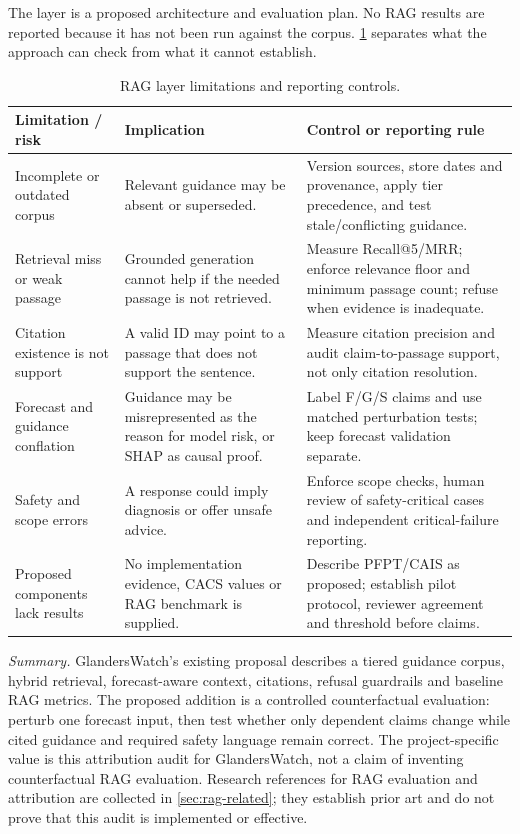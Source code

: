 \documentclass[10pt,openany]{report}
\begin{document}
The layer is a proposed architecture and evaluation plan. No RAG results are reported because it has
not been run against the corpus. \cref{tab:rag-limits} separates what the approach can check from
what it cannot establish.

\begin{table}[htbp]
\centering
\caption{RAG layer limitations and reporting controls.}
\label{tab:rag-limits}
\small
\begin{tabular}{@{}>{\raggedright\arraybackslash}p{3.4cm}
                >{\raggedright\arraybackslash}p{5.0cm}
                >{\raggedright\arraybackslash}p{5.4cm}@{}}
\toprule
\textbf{Limitation / risk} & \textbf{Implication} & \textbf{Control or reporting rule} \\
\midrule
Incomplete or outdated corpus &
Relevant guidance may be absent or superseded. &
Version sources, store dates and provenance, apply tier precedence, and test stale/conflicting guidance. \\
Retrieval miss or weak passage &
Grounded generation cannot help if the needed passage is not retrieved. &
Measure Recall@5/MRR; enforce relevance floor and minimum passage count; refuse when evidence is inadequate. \\
Citation existence is not support &
A valid ID may point to a passage that does not support the sentence. &
Measure citation precision and audit claim-to-passage support, not only citation resolution. \\
Forecast and guidance conflation &
Guidance may be misrepresented as the reason for model risk, or SHAP as causal proof. &
Label F/G/S claims and use matched perturbation tests; keep forecast validation separate. \\
Safety and scope errors &
A response could imply diagnosis or offer unsafe advice. &
Enforce scope checks, human review of safety-critical cases and independent critical-failure reporting. \\
Proposed components lack results &
No implementation evidence, CACS values or RAG benchmark is supplied. &
Describe PFPT/CAIS as proposed; establish pilot protocol, reviewer agreement and threshold before claims. \\
\bottomrule
\end{tabular}
\end{table}

\noindent\textit{Summary.} GlandersWatch's existing proposal describes a tiered guidance corpus,
hybrid retrieval, forecast-aware context, citations, refusal guardrails and baseline RAG metrics.
The proposed addition is a controlled counterfactual evaluation: perturb one forecast input, then
test whether only dependent claims change while cited guidance and required safety language remain
correct. The project-specific value is this attribution audit for GlandersWatch, not a claim of
inventing counterfactual RAG evaluation. Research references for RAG evaluation and attribution are
collected in \cref{sec:rag-related}; they establish prior art and do not prove that this audit is
implemented or effective.
\end{document}
